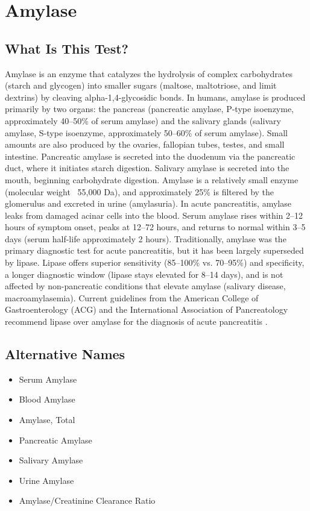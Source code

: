 \chapter{Amylase}

\section*{What Is This Test?}
Amylase is an enzyme that catalyzes the hydrolysis of complex carbohydrates (starch and glycogen) into smaller sugars (maltose, maltotriose, and limit dextrins) by cleaving alpha-1,4-glycosidic bonds. In humans, amylase is produced primarily by two organs: the pancreas (pancreatic amylase, P-type isoenzyme, approximately 40--50\% of serum amylase) and the salivary glands (salivary amylase, S-type isoenzyme, approximately 50--60\% of serum amylase). Small amounts are also produced by the ovaries, fallopian tubes, testes, and small intestine. Pancreatic amylase is secreted into the duodenum via the pancreatic duct, where it initiates starch digestion. Salivary amylase is secreted into the mouth, beginning carbohydrate digestion. Amylase is a relatively small enzyme (molecular weight ~55,000 Da), and approximately 25\% is filtered by the glomerulus and excreted in urine (amylasuria). In acute pancreatitis, amylase leaks from damaged acinar cells into the blood. Serum amylase rises within 2--12 hours of symptom onset, peaks at 12--72 hours, and returns to normal within 3--5 days (serum half-life approximately 2 hours). Traditionally, amylase was the primary diagnostic test for acute pancreatitis, but it has been largely superseded by lipase. Lipase offers superior sensitivity (85--100\% vs. 70--95\%) and specificity, a longer diagnostic window (lipase stays elevated for 8--14 days), and is not affected by non-pancreatic conditions that elevate amylase (salivary disease, macroamylasemia). Current guidelines from the American College of Gastroenterology (ACG) and the International Association of Pancreatology recommend lipase over amylase for the diagnosis of acute pancreatitis \cite{tenner2013american,banks2013classification}.

\section*{Alternative Names}
\begin{itemize}
  \item Serum Amylase
  \item Blood Amylase
  \item Amylase, Total
  \item Pancreatic Amylase
  \item Salivary Amylase
  \item Urine Amylase
  \item Amylase/Creatinine Clearance Ratio
\end{itemize}
